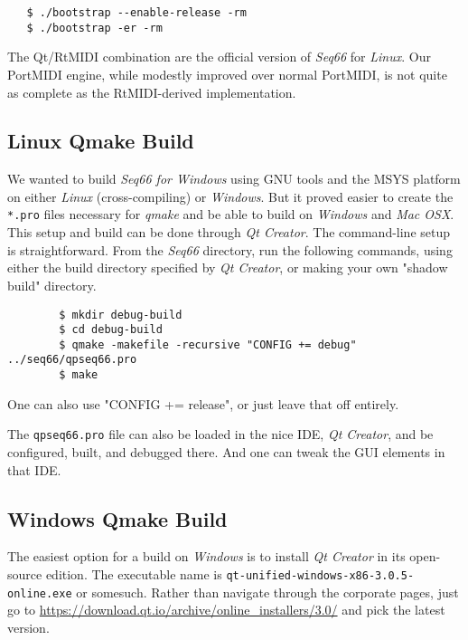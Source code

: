 \begin{verbatim}
   $ ./bootstrap --enable-release -rm
   $ ./bootstrap -er -rm
\end{verbatim}

   The Qt/RtMIDI combination are the official version
   of \textsl{Seq66} for \textsl{Linux}.
   Our PortMIDI engine, while modestly improved over normal PortMIDI, is not
   quite as complete as the RtMIDI-derived implementation.

\subsection{Linux Qmake Build}
\label{subsec:build_qmake}

   We wanted to build \textsl{Seq66 for Windows} using GNU tools and the
   MSYS platform on either \textsl{Linux} (cross-compiling) or
   \textsl{Windows}.  But it proved easier to create the
   \texttt{*.pro} files necessary for \textsl{qmake} and be able to build
   on \textsl{Windows} and \textsl{Mac OSX}.
   This setup and build can be done through \textsl{Qt Creator}.
   The command-line setup is straightforward.
   From the \textsl{Seq66} directory, run the following
   commands, using either the build directory specified by \textsl{Qt Creator},
   or making your own "shadow build" directory.

   \begin{verbatim}
        $ mkdir debug-build
        $ cd debug-build
        $ qmake -makefile -recursive "CONFIG += debug" ../seq66/qpseq66.pro
        $ make
   \end{verbatim}

    One can also use "CONFIG += release", or just leave that off entirely.

    The \texttt{qpseq66.pro} file can also be loaded in the
    nice IDE, \textsl{Qt Creator}, and be configured, built, and debugged
    there.  And one can tweak the GUI elements in that IDE.

\subsection{Windows Qmake Build}
\label{subsec:build_qmake_windows}

   The easiest option for a build on \textsl{Windows} is to install 
   \textsl{Qt Creator} in its open-source edition.
   The executable name is
   \texttt{qt-unified-windows-x86-3.0.5-online.exe} or somesuch.
   Rather than navigate through the corporate pages, just go to
   \url{https://download.qt.io/archive/online_installers/3.0/} and
   pick the latest version.
   

